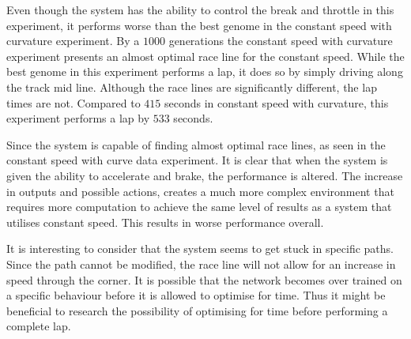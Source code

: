 Even though the system has the ability to control the break and throttle in this experiment, it performs worse than the best genome in the constant speed with curvature experiment. By a $1000$ generations the constant speed with curvature experiment presents an almost optimal race line for the constant speed. While the best genome in this experiment performs a lap, it does so by simply driving along the track mid line. Although the race lines are significantly different, the lap times are not. Compared to $415$ seconds in constant speed with curvature, this experiment performs a lap by $533$ seconds.

Since the system is capable of finding almost optimal race lines, as seen in the constant speed with curve data experiment. It is clear that when the system is given the ability to accelerate and brake, the performance is altered. The increase in outputs and possible actions, creates a much more complex environment that requires more computation to achieve the same level of results as a system that utilises constant speed. This results in worse performance overall.

It is interesting to consider that the system seems to get stuck in specific paths. Since the path cannot be modified, the race line will not allow for an increase in speed through the corner. It is possible that the network becomes over trained on a specific behaviour before it is allowed to optimise for time. Thus it might be beneficial to research the possibility of optimising for time before performing a complete lap. 


